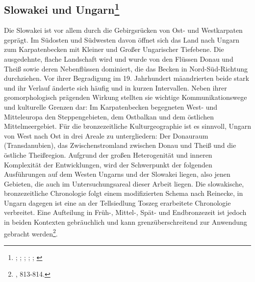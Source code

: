 \documentclass[openany,twoside,twocolumn]{book}
\let\rmarkdownfootnote\footnote%
\def\footnote{\protect\rmarkdownfootnote}
\begin{document}
\hypertarget{slowakei-und-ungarn}{%
\subsection[Slowakei und Ungarn]{\texorpdfstring{Slowakei und Ungarn\footnote{\textcite{furmanek_bronzezeit_1999}; \textcite{kemenczei_spatbronzezeit_1984}; \textcite{lochner_bestattungssitten_2013}; \textcite{markova_slovakia_2013}; \textcite{sorensen_landscapes_2008}; \textcite{vicze_bestattungen_1992}}}{Slowakei und Ungarn}}\label{slowakei-und-ungarn}}

Die Slowakei ist vor allem durch die Gebirgsrücken von Ost- und Westkarpaten geprägt. Im Südosten und Südwesten davon öffnet sich das Land nach Ungarn zum Karpatenbecken mit Kleiner und Großer Ungarischer Tiefebene. Die ausgedehnte, flache Landschaft wird und wurde von den Flüssen Donau und Theiß sowie deren Nebenflüssen dominiert, die das Becken in Nord-Süd-Richtung durchziehen. Vor ihrer Begradigung im 19. Jahrhundert mäandrierten beide stark und ihr Verlauf änderte sich häufig und in kurzen Intervallen. Neben ihrer geomorphologisch prägenden Wirkung stellten sie wichtige Kommunikationswege und kulturelle Grenzen dar: Im Karpatenbecken begegneten West- und Mitteleuropa den Steppengebieten, dem Ostbalkan und dem östlichen Mittelmeergebiet. Für die bronzezeitliche Kulturgeographie ist es sinnvoll, Ungarn von West nach Ost in drei Areale zu untergliedern: Der Donauraum (Transdanubien), das Zwischenstromland zwischen Donau und Theiß und die östliche Theißregion. Aufgrund der großen Heterogenität und inneren Komplexität der Entwicklungen, wird der Schwerpunkt der folgenden Ausführungen auf dem Westen Ungarns und der Slowakei liegen, also jenen Gebieten, die auch im Untersuchungsareal dieser Arbeit liegen. Die slowakische, bronzezeitliche Chronologie folgt einem modifizierten Schema nach Reinecke, in Ungarn dagegen ist eine an der Tellsiedlung Toszeg erarbeitete Chronologie verbreitet. Eine Aufteilung in Früh-, Mittel-, Spät- und Endbronzezeit ist jedoch in beiden Kontexten gebräuchlich und kann grenzüberschreitend zur Anwendung gebracht werden\footnote{\textcite{markova_slovakia_2013}, 813-814.}.
\end{document}
